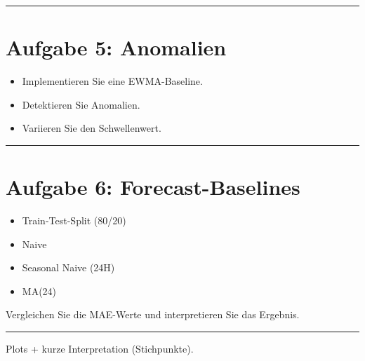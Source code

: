 \documentclass[
  ngerman,
  letterpaper,
  DIV=11]{scrreprt}
\providecommand{\tightlist}{%
  \setlength{\itemsep}{0pt}\setlength{\parskip}{0pt}}
\begin{document}
\begin{center}\rule{0.5\linewidth}{0.5pt}\end{center}

\section{Aufgabe 5: Anomalien}\label{aufgabe-5-anomalien}

\begin{itemize}
\tightlist
\item
  Implementieren Sie eine EWMA-Baseline.
\item
  Detektieren Sie Anomalien.
\item
  Variieren Sie den Schwellenwert.
\end{itemize}

\begin{center}\rule{0.5\linewidth}{0.5pt}\end{center}

\section{Aufgabe 6:
Forecast-Baselines}\label{aufgabe-6-forecast-baselines}

\begin{itemize}
\tightlist
\item
  Train-Test-Split (80/20)
\item
  Naive
\item
  Seasonal Naive (24H)
\item
  MA(24)
\end{itemize}

Vergleichen Sie die MAE-Werte und interpretieren Sie das Ergebnis.

\begin{center}\rule{0.5\linewidth}{0.5pt}\end{center}

\begin{tcolorbox}[enhanced jigsaw, titlerule=0mm, title=\textcolor{quarto-callout-note-color}{\faInfo}\hspace{0.5em}{Abgabeformat (optional)}, bottomrule=.15mm, opacityback=0, colbacktitle=quarto-callout-note-color!10!white, coltitle=black, opacitybacktitle=0.6, colframe=quarto-callout-note-color-frame, toprule=.15mm, leftrule=.75mm, arc=.35mm, rightrule=.15mm, breakable, bottomtitle=1mm, colback=white, toptitle=1mm, left=2mm]

Plots + kurze Interpretation (Stichpunkte).

\end{tcolorbox}
\end{document}

